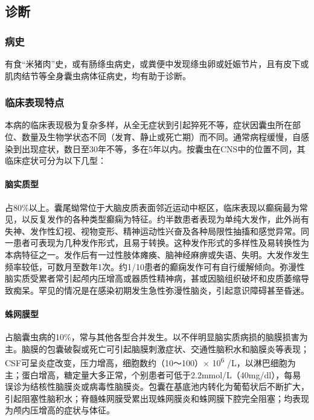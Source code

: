 \subsection{诊断}

\subsubsection{病史}

有食“米猪肉”史，或有肠绦虫病史，或粪便中发现绦虫卵或妊娠节片，且有皮下或肌肉结节等全身囊虫病体征病史，均有助于诊断。

\subsubsection{临床表现特点}

本病的临床表现极为复杂多样，从全无症状到引起猝死不等，症状因囊虫所在部位、数量及生物学状态不同（发育、静止或死亡期）而不同。通常病程缓慢，自感染到出现症状，数日至30年不等，多在5年以内。按囊虫在CNS中的位置不同，其临床症状可分为以下几型：

\paragraph{脑实质型}

占80\%以上。囊尾蚴常位于大脑皮质表面邻近运动中枢区，临床表现以癫痫最为常见，以反复发作的各种类型癫痫为特征。约半数患者表现为单纯大发作，此外尚有失神、发作性幻视、视物变形、精神运动性兴奋及各种局限性抽搐和感觉异常。同一患者可表现为几种发作形式，且易于转换。这种发作形式的多样性及易转换性为本病特征之一。发作后有一过性肢体瘫痪、脑神经麻痹或失语、失明。大发作发生频率较低，可数月至数年1次。约1/10患者的癫痫发作可有自行缓解倾向。弥漫性脑实质受累者常引起颅内压增高或器质性精神病，甚或因脑组织破坏和皮质萎缩导致痴呆。罕见的情况是在感染初期发生急性弥漫性脑炎，引起意识障碍甚至昏迷。

\paragraph{蛛网膜型}

占脑囊虫病的10\%，常与其他各型合并发生。以不伴明显脑实质病损的脑膜损害为主。脑膜的包囊破裂或死亡可引起脑膜刺激症状、交通性脑积水和脑膜炎等表现；CSF可呈炎症改变，压力增高，细胞数约（10～100）×
10\textsuperscript{6}
/L，以淋巴细胞为主；蛋白增高，糖定量大多正常，个别患者可低于2.2mmol/L（40mg/dl），每易误诊为结核性脑膜炎或病毒性脑膜炎。包囊在基底池内转化为葡萄状后不断扩大，引起阻塞性脑积水；脊髓蛛网膜受累出现蛛网膜炎和蛛网膜下腔完全阻塞；均表现为颅内压增高的症状与体征。

